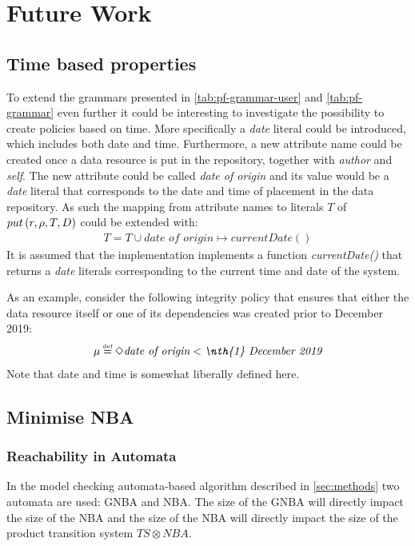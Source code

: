 \section{Future Work}\label{sec:future-work}
\subsection{Time based properties}
To extend the grammars presented in \autoref{tab:pf-grammar-user} and \autoref{tab:pf-grammar} even further it could be interesting to investigate the possibility to create policies based on time. More specifically a \emph{date} literal could be introduced, which includes both date and time. Furthermore, a new attribute name could be created once a data resource is put in the repository, together with \emph{author} and \emph{self}. The new attribute could be called \emph{date of origin} and its value would be a \emph{date} literal that corresponds to the date and time of placement in the data repository. As such the mapping from attribute names to literals $T$ of $put \left( r, \rho, T, D \right)$ could be extended with:
\begin{align*}
    T = T \cup \textit{date of origin} \mapsto currentDate()
\end{align*}
It is assumed that the implementation implements a function \emph{currentDate()} that returns a \emph{date} literals corresponding to the current time and date of the system.

As an example, consider the following integrity policy that ensures that either the data resource itself or one of its dependencies was created prior to  December 2019:
\begin{align*}
    \inte \eqdef \F \textit{date of origin} < \textit{\nth{1} December 2019}
\end{align*}
Note that date and time is somewhat liberally defined here.

\subsection{Minimise NBA}
\subsubsection{Reachability in Automata}\label{sec:reach}
In the model checking automata-based algorithm described in \autoref{sec:methods} two automata are used: GNBA and NBA. The size of the GNBA will directly impact the size of the NBA and the size of the NBA will directly impact the size of the product transition system $TS \otimes NBA$. 

